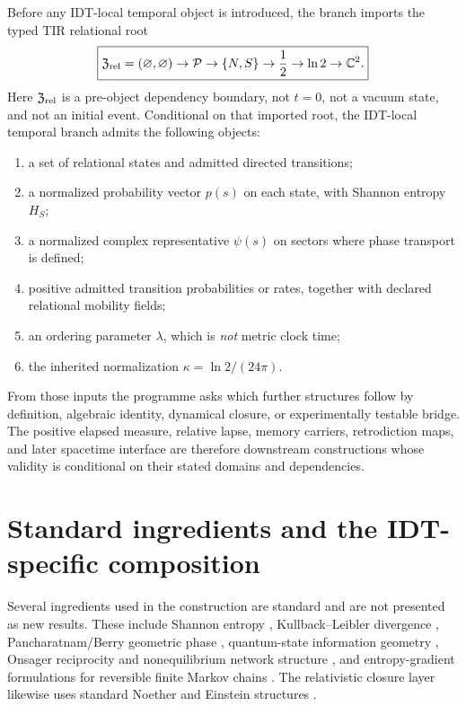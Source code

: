 Before any IDT-local temporal object is introduced, the branch imports the typed TIR relational root
\[
\boxed{
\mathfrak Z_{\rm rel}=(\varnothing,\varnothing)
\to\mathcal P
\to\{N,S\}
\to\frac12
\to\ln2
\to\mathbb C^2.
}
\]
Here \(\mathfrak Z_{\rm rel}\) is a pre-object dependency boundary, not \(t=0\), not a vacuum state, and not an initial event. Conditional on that imported root, the IDT-local temporal branch admits the following objects:
\begin{enumerate}
\item a set of relational states and admitted directed transitions;
\item a normalized probability vector \(p(s)\) on each state, with Shannon entropy \(H_S\);
\item a normalized complex representative \(\psi(s)\) on sectors where phase transport is defined;
\item positive admitted transition probabilities or rates, together with declared relational mobility fields;
\item an ordering parameter \(\lambda\), which is \emph{not} metric clock time;
\item the inherited normalization \(\kappa=\ln 2/(24\pi)\).
\end{enumerate}

From those inputs the programme asks which further structures follow by definition, algebraic identity, dynamical closure, or experimentally testable bridge. The positive elapsed measure, relative lapse, memory carriers, retrodiction maps, and later spacetime interface are therefore downstream constructions whose validity is conditional on their stated domains and dependencies.

\section*{Standard ingredients and the IDT-specific composition}

Several ingredients used in the construction are standard and are not presented as new results. These include Shannon entropy \cite{Shannon1948}, Kullback--Leibler divergence \cite{KullbackLeibler1951}, Pancharatnam/Berry geometric phase \cite{Pancharatnam1956,Berry1984}, quantum-state information geometry \cite{ProvostVallee1980}, Onsager reciprocity and nonequilibrium network structure \cite{Onsager1931,Schnakenberg1976}, and entropy-gradient formulations for reversible finite Markov chains \cite{Maas2011}. The relativistic closure layer likewise uses standard Noether and Einstein structures \cite{Noether1971,Einstein1916}.

